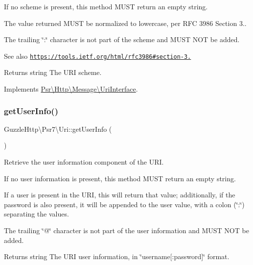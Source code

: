 If no scheme is present, this method M\+U\+ST return an empty string.

The value returned M\+U\+ST be normalized to lowercase, per R\+FC 3986 Section 3..

The trailing \char`\"{}\+:\char`\"{} character is not part of the scheme and M\+U\+ST N\+OT be added.

\begin{DoxySeeAlso}{See also}
\href{https://tools.ietf.org/html/rfc3986#section-3.1}{\tt https\+://tools.\+ietf.\+org/html/rfc3986\#section-\/3.} 
\end{DoxySeeAlso}
\begin{DoxyReturn}{Returns}
string The U\+RI scheme. 
\end{DoxyReturn}


Implements \hyperlink{interfacePsr_1_1Http_1_1Message_1_1UriInterface_a12b7d87a6b448aaf0cb4978029dc5ecc}{Psr\textbackslash{}\+Http\textbackslash{}\+Message\textbackslash{}\+Uri\+Interface}.

\mbox{\label{classGuzzleHttp_1_1Psr7_1_1Uri_aabfb1fcf87f211fc73783d99adf09c8e}} 
\subsubsection{\texorpdfstring{get\+User\+Info()}{getUserInfo()}}
{\footnotesize\ttfamily Guzzle\+Http\textbackslash{}\+Psr7\textbackslash{}\+Uri\+::get\+User\+Info (\begin{DoxyParamCaption}{ }\end{DoxyParamCaption})}

Retrieve the user information component of the U\+RI.

If no user information is present, this method M\+U\+ST return an empty string.

If a user is present in the U\+RI, this will return that value; additionally, if the password is also present, it will be appended to the user value, with a colon (\char`\"{}\+:\char`\"{}) separating the values.

The trailing \char`\"{}@\char`\"{} character is not part of the user information and M\+U\+ST N\+OT be added.

\begin{DoxyReturn}{Returns}
string The U\+RI user information, in \char`\"{}username\mbox{[}\+:password\mbox{]}\char`\"{} format. 
\end{DoxyReturn}


